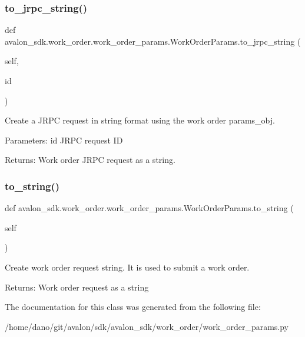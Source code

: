 \subsubsection{\texorpdfstring{to\+\_\+jrpc\+\_\+string()}{to\_jrpc\_string()}}
{\footnotesize\ttfamily def avalon\+\_\+sdk.\+work\+\_\+order.\+work\+\_\+order\+\_\+params.\+Work\+Order\+Params.\+to\+\_\+jrpc\+\_\+string (\begin{DoxyParamCaption}\item[{}]{self,  }\item[{}]{id }\end{DoxyParamCaption})}

\begin{DoxyVerb}Create a JRPC request in string format using
the work order params_obj.

Parameters:
id         JRPC request ID

Returns:
Work order JRPC request as a string.
\end{DoxyVerb}
 \mbox{\label{classavalon__sdk_1_1work__order_1_1work__order__params_1_1WorkOrderParams_a89ddf2c848b2cddd4231f579659e05e7}} 
\subsubsection{\texorpdfstring{to\+\_\+string()}{to\_string()}}
{\footnotesize\ttfamily def avalon\+\_\+sdk.\+work\+\_\+order.\+work\+\_\+order\+\_\+params.\+Work\+Order\+Params.\+to\+\_\+string (\begin{DoxyParamCaption}\item[{}]{self }\end{DoxyParamCaption})}

\begin{DoxyVerb}Create work order request string.
It is used to submit a work order.

Returns:
Work order request as a string
\end{DoxyVerb}
 

The documentation for this class was generated from the following file\+:\begin{DoxyCompactItemize}
\item 
/home/dano/git/avalon/sdk/avalon\+\_\+sdk/work\+\_\+order/work\+\_\+order\+\_\+params.\+py\end{DoxyCompactItemize}
